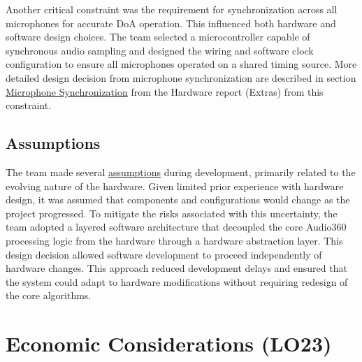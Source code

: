 \documentclass{article}
\begin{document}
Another critical constraint was the requirement for synchronization across all
microphones for accurate DoA operation. This influenced both hardware and
software design choices. The team selected a microcontroller capable of
synchronous audio sampling and designed the wiring and software clock
configuration to ensure all microphones operated on a shared timing source.
More detailed design decision from microphone synchronization are described in
section \hyperref[Hardware-sec:mic_sync]{Microphone Synchronization} from the
Hardware report (Extras) from this constraint.

\subsection{Assumptions}

The team made several \hyperref[MG-SecChange]{assumptions} during development,
primarily related to the evolving nature of the hardware. Given limited prior
experience with hardware design, it was assumed that components and
configurations would change as the project progressed. To mitigate the risks
associated with this uncertainty, the team adopted a layered software
architecture that decoupled the core Audio360 processing logic from the hardware
through a hardware abstraction layer. This design decision allowed software
development to proceed independently of hardware changes. This approach reduced
development delays and ensured that the system could adapt to hardware
modifications without requiring redesign of the core algorithms.

\section{Economic Considerations (LO23)}
\end{document}
